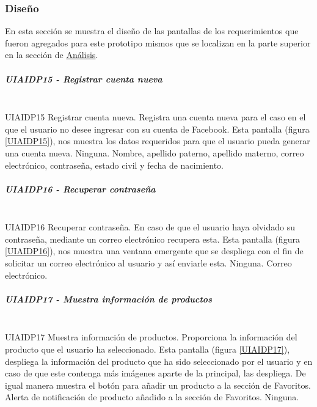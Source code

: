 \subsubsection{Diseño}
En esta sección se muestra el diseño de las pantallas de los requerimientos que fueron agregados para este prototipo mismos que se localizan en la parte superior en la sección de \hyperlink{analisis}{Análisis}. \newpage
\subparagraph{UIAIDP15 - Registrar cuenta nueva}~\\
\FloatBarrier
{} %
{UIAIDP15} %
{Registrar cuenta nueva.}  %
{Registra una cuenta nueva para el caso en el que el usuario no desee ingresar con su cuenta de Facebook.} %
{Esta pantalla (figura \ref{UIAIDP15}), nos muestra los datos requeridos para que el usuario pueda generar una cuenta nueva.} %
{Ninguna.} %
{Nombre, apellido paterno, apellido materno, correo electrónico, contraseña, estado civil y fecha de nacimiento.} %
\FloatBarrier

\subparagraph{UIAIDP16 - Recuperar contraseña} ~\\
\FloatBarrier
{} %
{UIAIDP16} %
{Recuperar contraseña.}  %
{En caso de que el usuario haya olvidado su contraseña, mediante un correo electrónico recupera esta.} %
{Esta pantalla (figura \ref{UIAIDP16}), nos muestra una ventana emergente que se despliega con el fin de solicitar un correo electrónico al usuario y así enviarle esta.} %
{Ninguna.} %
{Correo electrónico.} %
\FloatBarrier

\subparagraph{UIAIDP17 - Muestra información de productos} ~\\
\FloatBarrier
{} %
{UIAIDP17} %
{Muestra información de productos.}  %
{Proporciona la información del producto que el usuario ha seleccionado.} %
{Esta pantalla (figura \ref{UIAIDP17}), despliega la información del producto que ha sido seleccionado por el usuario y en caso de que este contenga más imágenes aparte de la principal, las despliega. De igual manera muestra el botón para añadir un producto a la sección de Favoritos.} %
{Alerta de notificación de producto añadido a la sección de Favoritos.} %
{Ninguna.} %
\FloatBarrier

